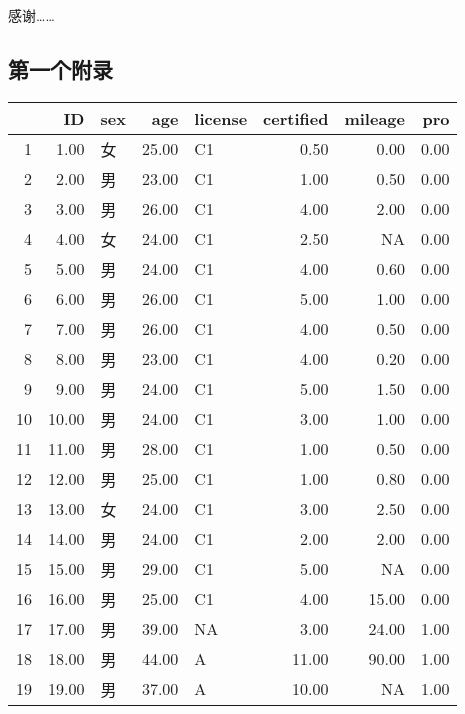 \documentclass[unicode,master,printedition]{seuthesis} %
\begin{document}
\begin{Thanks}
感谢……
\end{Thanks}


%

\begin{Appendix}
  \chapter{第一个附录}%
\begin{table}[ht]
\begin{center}
\begin{tabular}{rrlrlrrr}
  \hline
 & ID & sex & age & license & certified & mileage & pro \\ 
  \hline
1 & 1.00 & 女 & 25.00 & C1 & 0.50 & 0.00 & 0.00 \\ 
  2 & 2.00 & 男 & 23.00 & C1 & 1.00 & 0.50 & 0.00 \\ 
  3 & 3.00 & 男 & 26.00 & C1 & 4.00 & 2.00 & 0.00 \\ 
  4 & 4.00 & 女 & 24.00 & C1 & 2.50 & NA & 0.00 \\ 
  5 & 5.00 & 男 & 24.00 & C1 & 4.00 & 0.60 & 0.00 \\ 
  6 & 6.00 & 男 & 26.00 & C1 & 5.00 & 1.00 & 0.00 \\ 
  7 & 7.00 & 男 & 26.00 & C1 & 4.00 & 0.50 & 0.00 \\ 
  8 & 8.00 & 男 & 23.00 & C1 & 4.00 & 0.20 & 0.00 \\ 
  9 & 9.00 & 男 & 24.00 & C1 & 5.00 & 1.50 & 0.00 \\ 
  10 & 10.00 & 男 & 24.00 & C1 & 3.00 & 1.00 & 0.00 \\ 
  11 & 11.00 & 男 & 28.00 & C1 & 1.00 & 0.50 & 0.00 \\ 
  12 & 12.00 & 男 & 25.00 & C1 & 1.00 & 0.80 & 0.00 \\ 
  13 & 13.00 & 女 & 24.00 & C1 & 3.00 & 2.50 & 0.00 \\ 
  14 & 14.00 & 男 & 24.00 & C1 & 2.00 & 2.00 & 0.00 \\ 
  15 & 15.00 & 男 & 29.00 & C1 & 5.00 & NA & 0.00 \\ 
  16 & 16.00 & 男 & 25.00 & C1 & 4.00 & 15.00 & 0.00 \\ 
  17 & 17.00 & 男 & 39.00 & NA & 3.00 & 24.00 & 1.00 \\ 
  18 & 18.00 & 男 & 44.00 & A & 11.00 & 90.00 & 1.00 \\ 
  19 & 19.00 & 男 & 37.00 & A & 10.00 & NA & 1.00 \\ 

\end{tabular}
\end{center}
\end{table}
\end{Appendix}
\end{document}
